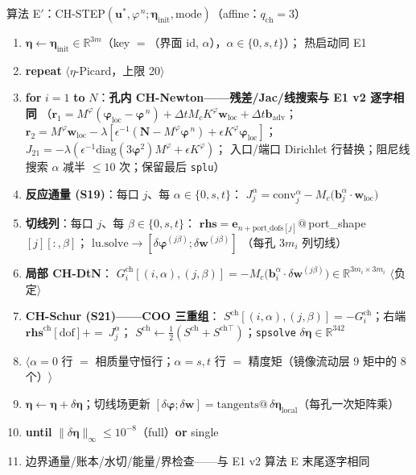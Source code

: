 \documentclass[11pt]{article}
\newcommand{\code}[1]{\texttt{#1}}
\newcommand{\kwd}[1]{\textbf{#1}}
\newcommand{\cmt}[1]{{\color{cmtclr}$\langle$#1$\rangle$}}
\newcommand{\ind}{\hspace*{1.5em}}
\newenvironment{pseudo}[1]{\begin{algobox}{#1}%
  \begin{enumerate}[label={\ttfamily\arabic*}, leftmargin=3.4em, itemsep=1.5pt, topsep=1pt, parsep=0pt]}%
  {\end{enumerate}\end{algobox}}
\begin{document}
\begin{pseudo}{算法 E$'$：CH-STEP$(\bm u^{*},\varphi^{\,n};\bm\eta_{\mathrm{init}},\mathrm{mode})$（affine：$q_{\mathrm{ch}}=3$）}
\item $\bm\eta\leftarrow\bm\eta_{\mathrm{init}}\in\mathbb R^{3m}$（key $=$（界面 id, $\alpha$），$\alpha\in\{0,s,t\}$）；
热启动同 E1
\item \kwd{repeat} \cmt{$\eta$-Picard，上限 20}
\item \ind \kwd{for} $i=1$ \kwd{to} $N$：\textbf{孔内 CH-Newton——残差/Jac/线搜索与 E1 v2 逐字相同}
（$\bm r_1=M^{\varphi}(\bm\varphi_{\mathrm{loc}}-\bm\varphi^{\,n})+\Delta tM_cK^{\varphi}\bm w_{\mathrm{loc}}+\Delta t\bm b_{\mathrm{adv}}$；
$\bm r_2=M^{\varphi}\bm w_{\mathrm{loc}}-\lambda[\epsilon^{-1}(\bm N-M^{\varphi}\bm\varphi^{\,n})+\epsilon K^{\varphi}\bm\varphi_{\mathrm{loc}}]$；
$J_{21}=-\lambda(\epsilon^{-1}\mathrm{diag}(3\bm\varphi^2)M^{\varphi}+\epsilon K^{\varphi})$；
入口/端口 Dirichlet 行替换；阻尼线搜索 $\alpha$ 减半 $\le10$ 次；保留最后 \code{splu}）
\item \ind \textbf{反应通量 (S19)}：每口 $j$、每 $\alpha\in\{0,s,t\}$：
$J_j^{\alpha}=\mathrm{conv}_j^{\alpha}-M_c\big(\bm b_j^{\alpha}\!\cdot\!\bm w_{\mathrm{loc}}\big)$
\item \ind \textbf{切线列}：每口 $j$、每 $\beta\in\{0,s,t\}$：
$\bm{rhs}=\bm e_{n+\mathrm{port\_dofs}[j]}@$\,port\_shape$[j][:,\beta]$；
$\mathrm{lu.solve}\to[\delta\bm\varphi^{(j\beta)};\delta\bm w^{(j\beta)}]$
（每孔 $3m_i$ 列切线）
\item \ind \textbf{局部 CH-DtN}：
$G_i^{\mathrm{ch}}[(i,\alpha),(j,\beta)]=-M_c\big(\bm b_i^{\alpha}\!\cdot\!\delta\bm w^{(j\beta)}\big)
\in\mathbb R^{3m_i\times3m_i}$ \cmt{负定}
\item \textbf{CH-Schur (S21)——COO 三重组}：
$S^{\mathrm{ch}}[(i,\alpha),(j,\beta)]=-G_i^{\mathrm{ch}}$；右端 $\bm{rhs}^{\mathrm{ch}}[\mathrm{dof}]+{=}\ J_j^{\alpha}$；
$S^{\mathrm{ch}}\leftarrow\tfrac12(S^{\mathrm{ch}}+S^{\mathrm{ch}\!\top})$；\code{spsolve}
$\delta\bm\eta\in\mathbb R^{342}$
\item[] \cmt{$\alpha=0$ 行 $=$ 相质量守恒行；$\alpha=s,t$ 行 $=$ 精度矩（镜像流动层 9 矩中的 8 个）}
\item $\bm\eta\leftarrow\bm\eta+\delta\bm\eta$；切线场更新
$[\delta\bm\varphi;\delta\bm w]=\mathrm{tangents}@\,\delta\bm\eta_{\mathrm{local}}$（每孔一次矩阵乘）
\item \kwd{until} $\|\delta\bm\eta\|_\infty\le10^{-8}$（full）\kwd{or} single
\item 边界通量/账本/水切/能量/界检查——与 E1 v2 算法 E 末尾逐字相同
\end{pseudo}
\end{document}
